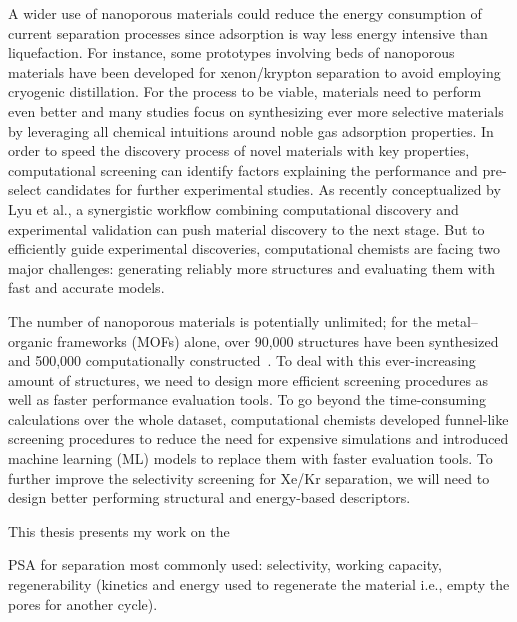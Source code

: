 A wider use of nanoporous materials could reduce the energy consumption of current separation processes since adsorption is way less energy intensive than liquefaction.\autocite{national2019research} For instance, some prototypes involving beds of nanoporous materials have been developed for xenon/krypton separation to avoid employing cryogenic distillation.\autocite{Banerjee2018} For the process to be viable, materials need to perform even better and many studies focus on synthesizing ever more selective materials by leveraging all chemical intuitions around noble gas adsorption properties.\autocite{Chen_2014, Li_2019, Pei_2022} In order to speed the discovery process of novel materials with key properties, computational screening can identify factors explaining the performance and pre-select candidates for further experimental studies. As recently conceptualized by Lyu et al., a synergistic workflow combining computational discovery and experimental validation can push material discovery to the next stage.\autocite{Lyu_2020, Jablonka_2022} But to efficiently guide experimental discoveries, computational chemists are facing two major challenges: generating reliably more structures and evaluating them with fast and accurate models.

The number of nanoporous materials is potentially unlimited; for the metal--organic frameworks (MOFs) alone, over 90,000 structures have been synthesized~\autocite{Groom_2016} and 500,000 computationally constructed~\autocite{Wilmer_2012,Boyd_2016,Colon_2017}. To deal with this ever-increasing amount of structures, we need to design more efficient screening procedures as well as faster performance evaluation tools. To go beyond the time-consuming calculations over the whole dataset, computational chemists developed funnel-like screening procedures to reduce the need for expensive simulations and introduced machine learning (ML) models to replace them with faster evaluation tools.\autocite{Ren_2022} To further improve the selectivity screening for Xe/Kr separation, we will need to design better performing structural and energy-based descriptors.



\begin{center}
\end{center}

This thesis presents my work on the 


PSA for separation most commonly used: selectivity, working capacity, regenerability (kinetics and energy used to regenerate the material i.e., empty the pores for another cycle).\autocite{Kumar_1994}

\vfill
\begin{center}
\end{center}
\vfill\vfill